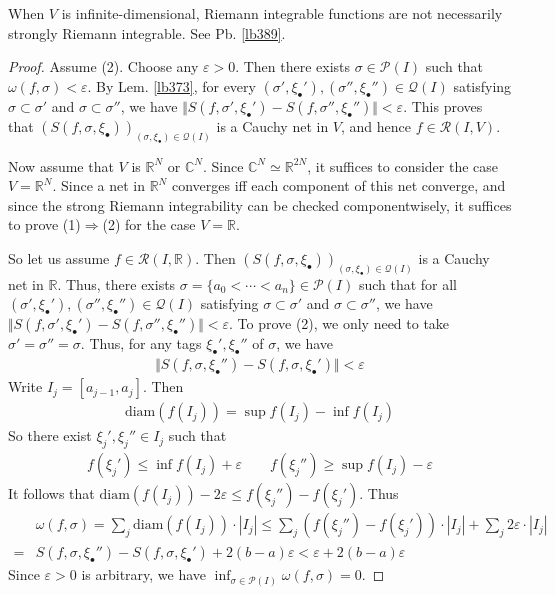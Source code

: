 \documentclass[12pt,b5paper,notitlepage]{article}
\theoremstyle{definition}
\theoremstyle{plain}
\newcommand{\mc}{\mathcal}
\newcommand{\scr}{\mathscr}
\newcommand{\blt}{\bullet}
\newcommand{\Cbb}{\mathbb C}
\newcommand{\Rbb}{\mathbb R}
\newcommand{\dps}{\displaystyle}
\newcommand{\diam}{\mathrm{diam}}
\newcommand{\eps}{\varepsilon}
\numberwithin{equation}{section}
\begin{document}
When $V$ is infinite-dimensional, Riemann integrable functions are not necessarily strongly Riemann integrable. See Pb. \ref{lb389}.

\begin{proof}
Assume (2). Choose any $\eps>0$. Then there exists $\sigma\in\mc P(I)$ such that $\omega(f,\sigma)<\eps$. By Lem. \ref{lb373}, for every $(\sigma',\xi_\blt'),(\sigma'',\xi_\blt'')\in\mc Q(I)$ satisfying $\sigma\subset\sigma'$ and $\sigma\subset\sigma''$, we have $\Vert S(f,\sigma',\xi_\blt')-S(f,\sigma'',\xi_\blt'')\Vert<\eps$. This proves that $(S(f,\sigma,\xi_\blt))_{(\sigma,\xi_\blt)\in\mc Q(I)}$ is a Cauchy net in $V$, and hence $f\in\scr R(I,V)$.

Now assume that $V$ is $\Rbb^N$ or $\Cbb^N$. Since $\Cbb^N\simeq\Rbb^{2N}$, it suffices to consider the case $V=\Rbb^N$. Since a net in $\Rbb^N$ converges iff each component of this net converge, and since the strong Riemann integrability can be checked componentwisely, it suffices to prove (1)$\Rightarrow$(2) for the case $V=\Rbb$.

So let us assume $f\in\scr R(I,\Rbb)$. Then $(S(f,\sigma,\xi_\blt))_{(\sigma,\xi_\blt)\in\mc Q(I)}$ is a Cauchy net in $\Rbb$. Thus, there exists $\sigma=\{a_0<\cdots<a_n\}\in\mc P(I)$ such that for all $(\sigma',\xi_\blt'),(\sigma'',\xi_\blt'')\in\mc Q(I)$ satisfying $\sigma\subset\sigma'$ and $\sigma\subset\sigma''$, we have $\Vert S(f,\sigma',\xi_\blt')-S(f,\sigma'',\xi_\blt'')\Vert<\eps$. To prove (2), we only need to take $\sigma'=\sigma''=\sigma$. Thus, for any tags $\xi_\blt',\xi_\blt''$ of $\sigma$, we have
\begin{align*}
\Vert S(f,\sigma,\xi_\blt'')-S(f,\sigma,\xi_\blt')\Vert<\eps
\end{align*}
Write $I_j=[a_{j-1},a_j]$. Then
\begin{align*}
\diam(f(I_j))=\sup f(I_j)-\inf f(I_j)
\end{align*}
So  there exist $\xi_j',\xi_j''\in I_j$ such that
\begin{gather*}
f(\xi_j')\leq \inf f(I_j)+\eps\qquad f(\xi_j'')\geq\sup f(I_j)-\eps
\end{gather*}
It follows that $\dps\diam(f(I_j))-2\eps\leq f(\xi_j'')-f(\xi_j')$. Thus
\begin{align*}
&\omega(f,\sigma)=\sum_j \diam(f(I_j))\cdot|I_j|\leq\sum_j (f(\xi_j'')-f(\xi_j'))\cdot|I_j|+\sum_j2\eps\cdot|I_j|\\
=& S(f,\sigma,\xi_\blt'')-S(f,\sigma,\xi_\blt')+2(b-a)\eps<\eps+2(b-a)\eps
\end{align*}
Since $\eps>0$ is arbitrary, we have $\inf_{\sigma\in\mc P(I)} \omega(f,\sigma)=0$.
\end{proof}
\end{document}
